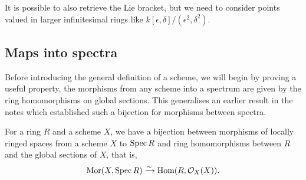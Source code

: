 It is possible to also retrieve the Lie bracket, but we need to consider points valued in larger infinitesimal rings like \(k[\epsilon,\delta]/(\epsilon^2,\delta^2)\).

\subsection{Maps into spectra}

Before introducing the general definition of a scheme, we will begin by proving a useful property, the morphisms from any scheme into a spectrum are given by the ring homomorphisms on global sections. This generalises an earlier result in the notes which established such a bijection for morphisms between spectra.


\begin{theorem}
For a ring $R$ and a scheme $X$, we have a bijection between morphisms of locally ringed spaces from a scheme $X$ to $\operatorname{Spec} R$ and ring homomorphisms between $R$ and the global sections of $X$, that is,
\begin{equation}
\textnormal{Mor}(X, \operatorname{Spec} R) \xrightarrow{\sim} \textnormal{Hom}(R, \mathcal{O}_X(X)).
\end{equation}
\end{theorem}

